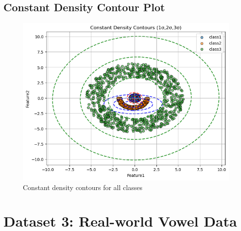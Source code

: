 \documentclass[12pt,a4paper]{article}
\begin{document}
\subsection{Constant Density Contour Plot}
\begin{figure}[H]
    \centering
    \includegraphics[width=\linewidth]{images/NLS_Group04_images/02_constant_density_contour.png}
    \caption{Constant density contours for all classes}
\end{figure}






\section{Dataset 3: Real-world Vowel Data}
\end{document}
